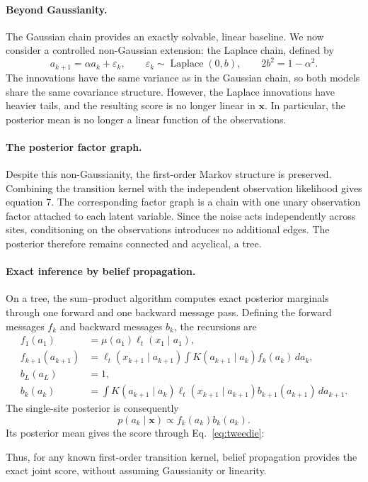 \paragraph{Beyond Gaussianity.}
The Gaussian chain provides an exactly solvable, linear baseline.
We now consider a controlled non-Gaussian extension: the Laplace
chain, defined by
\begin{equation}
    a_{k+1}=\alpha a_k+\varepsilon_k,
    \qquad
    \varepsilon_k\sim\operatorname{Laplace}(0,b),
    \qquad
    2b^2=1-\alpha^2.
\end{equation}
The innovations have the same variance as in the Gaussian chain,
so both models share the same covariance structure. However, the
Laplace innovations have heavier tails, and the resulting score
is no longer linear in $\mathbf x$. In particular, the posterior
mean is no longer a linear function of the observations.

\paragraph{The posterior factor graph.}
Despite this non-Gaussianity, the first-order Markov structure
is preserved. Combining the transition kernel with the independent
observation likelihood gives equation 7.
The corresponding factor graph is a chain with one unary
observation factor attached to each latent variable. Since the
noise acts independently across sites, conditioning on the
observations introduces no additional edges. The posterior
therefore remains connected and acyclical, a tree.

\paragraph{Exact inference by belief propagation.}
On a tree, the sum--product algorithm computes exact posterior
marginals through one forward and one backward message pass.
Defining the forward messages $f_k$ and backward messages $b_k$,
the recursions are
\begin{align}
    f_1(a_1)
    &=\mu(a_1)\ell_t(x_1\mid a_1),\\
    f_{k+1}(a_{k+1})
    &=\ell_t(x_{k+1}\mid a_{k+1})
      \int K(a_{k+1}\mid a_k)f_k(a_k)\,da_k,\\
    b_L(a_L)&=1,\\
    b_k(a_k)
    &=\int K(a_{k+1}\mid a_k)
      \ell_t(x_{k+1}\mid a_{k+1})
      b_{k+1}(a_{k+1})\,da_{k+1}.
\end{align}
The single-site posterior is consequently
\begin{equation}
    p(a_k\mid\mathbf x)
    \propto f_k(a_k)b_k(a_k).
\end{equation}
Its posterior mean gives the score through
Eq.~\eqref{eq:tweedie}:

Thus, for any known first-order transition kernel, belief
propagation provides the exact joint score, without assuming
Gaussianity or linearity.